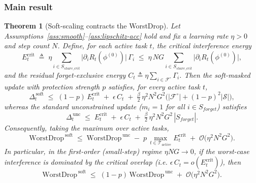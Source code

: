 \documentclass[conference]{IEEEtran}
\theoremstyle{plain}
\newtheorem{theorem}{Theorem}
\theoremstyle{definition}
\theoremstyle{remark}
\begin{document}
\subsubsection*{Main result}

\begin{theorem}[Soft-scaling contracts the WorstDrop]
\label{thm:worstdrop}
Let Assumptions~\ref{ass:smooth}--\ref{ass:lipschitz-acc} hold and fix
a learning rate $\eta>0$ and step count $N$. Define, for each active
task $t$, the \emph{critical interference energy}
\begin{equation}
\label{eq:Ecrit}
E^{\mathrm{crit}}_{t}\;\triangleq\;
\eta\!\!\sum_{i\in S_{share\_crit}}\!\!
\big|\partial_{i}R_{t}(\phi^{(0)})\big|\,\Gamma_{i}
\;\le\; \eta\,NG\!\!\sum_{i\in S_{share\_crit}}\!\!\big|\partial_{i}R_{t}(\phi^{(0)})\big|,
\end{equation}
and the residual forget-exclusive energy
$C_{t}\triangleq\eta\sum_{i\in\mathcal{F}^{\!\circ}}\Gamma_{i}$.
Then the soft-masked update with protection strength $p$ satisfies,
for every active task $t$,
\begin{equation}
\label{eq:soft-bound}
\Delta_{t}^{\,\mathrm{soft}}
\;\le\;
(1-p)\,E^{\mathrm{crit}}_{t}
\;+\;\epsilon\,C_{t}
\;+\;\tfrac{\beta}{2}\,\eta^{2}N^{2}G^{2}
      \Big(|\mathcal{F}^{\!\circ}| + (1-p)^{2}|\mathcal{S}|\Big),
\end{equation}
whereas the standard unconstrained update ($m_{i}=1$ for all
$i\in S_{forget}$) satisfies
\begin{equation}
\label{eq:unc-bound}
\Delta_{t}^{\,\mathrm{unc}}
\;\le\;
E^{\mathrm{crit}}_{t}
\;+\;\epsilon\,C_{t}
\;+\;\tfrac{\beta}{2}\,\eta^{2}N^{2}G^{2}\,|S_{forget}|.
\end{equation}
Consequently, taking the maximum over active tasks,
\begin{equation}
\label{eq:worstdrop-gap}
\mathrm{WorstDrop}^{\,\mathrm{soft}}
\;\le\;
\mathrm{WorstDrop}^{\,\mathrm{unc}}
\;-\;p\,\max_{t\in\mathcal{T}_{active}}E^{\mathrm{crit}}_{t}
\;+\;\mathcal{O}\!\big(\eta^{2}N^{2}G^{2}\big).
\end{equation}
In particular, in the first-order (small-step) regime
$\eta NG\!\to\!0$, if the worst-case interference is dominated by the
critical overlap (i.e. $\epsilon\,C_{t}=o(E^{\mathrm{crit}}_{t})$),
then
\begin{equation}
\label{eq:contraction}
\boxed{\;
\mathrm{WorstDrop}^{\,\mathrm{soft}}
\;\le\;(1-p)\,\mathrm{WorstDrop}^{\,\mathrm{unc}}
\;+\;\mathcal{O}\!\big(\eta^{2}N^{2}G^{2}\big).\;}
\end{equation}
\end{theorem}
\end{document}
